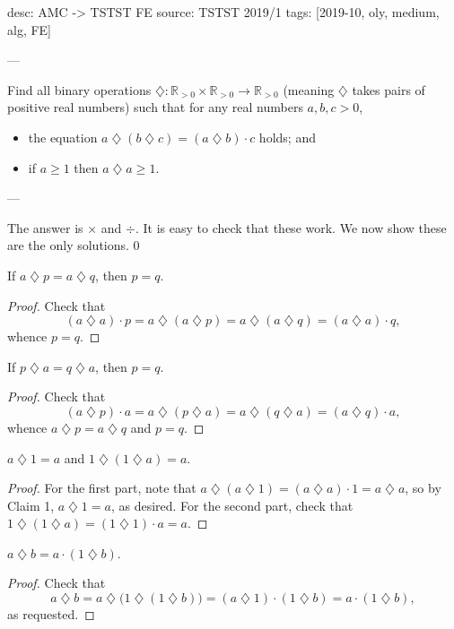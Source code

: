 desc: AMC -> TSTST FE
source: TSTST 2019/1
tags: [2019-10, oly, medium, alg, FE]

---

Find all binary operations $\mathbin{\diamondsuit}:\mathbb R_{>0}\times\mathbb R_{>0}\to\mathbb R_{>0}$ (meaning $\mathbin{\diamondsuit}$ takes pairs of positive real numbers) such that for any real numbers $a,b,c>0$,
\begin{itemize}[itemsep=0em]
    \item the equation $a\mathbin{\diamondsuit}(b\mathbin{\diamondsuit}c)=(a\mathbin{\diamondsuit}b)\cdot c$ holds; and
    \item if $a\ge 1$ then $a\mathbin{\diamondsuit}a\ge 1$.
\end{itemize}

---

The answer is $\times$ and $\div$. It is easy to check that these work. We now show these are the only solutions.
\setcounter{claim}0
\begin{claim}
    If $a\mathbin{\diamondsuit}p=a\mathbin{\diamondsuit}q$, then $p=q$.
\end{claim}
\begin{proof}
    Check that \[(a\mathbin{\diamondsuit}a)\cdot p=a\mathbin{\diamondsuit}(a\mathbin{\diamondsuit}p)=a\mathbin{\diamondsuit}(a\mathbin{\diamondsuit}q)=(a\mathbin{\diamondsuit}a)\cdot q,\]
    whence $p=q$.
\end{proof}
\begin{claim}
    If $p\mathbin{\diamondsuit}a=q\mathbin{\diamondsuit}a$, then $p=q$.
\end{claim}
\begin{proof}
    Check that \[(a\mathbin{\diamondsuit}p)\cdot a=a\mathbin{\diamondsuit}(p\mathbin{\diamondsuit}a)=a\mathbin{\diamondsuit}(q\mathbin{\diamondsuit}a)=(a\mathbin{\diamondsuit}q)\cdot a,\]
    whence $a\mathbin{\diamondsuit}p=a\mathbin{\diamondsuit}q$ and $p=q$.
\end{proof}
\begin{claim}
    $a\mathbin{\diamondsuit}1=a$ and $1\mathbin{\diamondsuit}(1\mathbin{\diamondsuit}a)=a$.
\end{claim}
\begin{proof}
    For the first part, note that $a\mathbin{\diamondsuit}(a\mathbin{\diamondsuit}1)=(a\mathbin{\diamondsuit}a)\cdot 1=a\mathbin{\diamondsuit}a$, so by Claim 1, $a\mathbin{\diamondsuit}1=a$, as desired. For the second part, check that $1\mathbin{\diamondsuit}(1\mathbin{\diamondsuit}a)=(1\mathbin{\diamondsuit}1)\cdot a=a$.
\end{proof}
\begin{claim}
    $a\mathbin{\diamondsuit}b=a\cdot(1\mathbin{\diamondsuit}b)$.
\end{claim}
\begin{proof}
    Check that \[a\mathbin{\diamondsuit}b=a\mathbin{\diamondsuit}\big(1\mathbin{\diamondsuit}(1\mathbin{\diamondsuit}b)\big)=(a\mathbin{\diamondsuit}1)\cdot(1\mathbin{\diamondsuit}b)=a\cdot(1\mathbin{\diamondsuit}b),\]
    as requested.
\end{proof}

